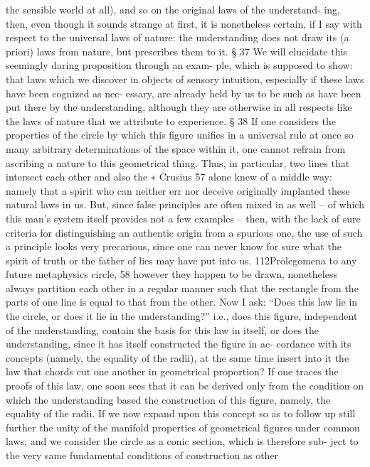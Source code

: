 the sensible world at all), and so on the original laws of the understand-
ing, then, even though it sounds strange at ﬁrst, it is nonetheless certain,
if I say with respect to the universal laws of nature: the understanding does
not draw its (a priori) laws from nature, but prescribes them to it.
§ 37
We will elucidate this seemingly daring proposition through an exam-
ple, which is supposed to show: that laws which we discover in objects
of sensory intuition, especially if these laws have been cognized as nec-
essary, are already held by us to be such as have been put there by the
understanding, although they are otherwise in all respects like the laws
of nature that we attribute to experience.
§ 38
If one considers the properties of the circle by which this ﬁgure uniﬁes
in a universal rule at once so many arbitrary determinations of the space
within it, one cannot refrain from ascribing a nature to this geometrical
thing. Thus, in particular, two lines that intersect each other and also the
∗
Crusius 57 alone knew of a middle way: namely that a spirit who can neither
err nor deceive originally implanted these natural laws in us. But, since false
principles are often mixed in as well – of which this man’s system itself provides
not a few examples – then, with the lack of sure criteria for distinguishing an
authentic origin from a spurious one, the use of such a principle looks very
precarious, since one can never know for sure what the spirit of truth or the
father of lies may have put into us.
112Prolegomena to any future metaphysics
circle, 58 however they happen to be drawn, nonetheless always partition
each other in a regular manner such that the rectangle from the parts of
one line is equal to that from the other. Now I ask: “Does this law lie
in the circle, or does it lie in the understanding?” i.e., does this ﬁgure,
independent of the understanding, contain the basis for this law in itself,
or does the understanding, since it has itself constructed the ﬁgure in ac-
cordance with its concepts (namely, the equality of the radii), at the same
time insert into it the law that chords cut one another in geometrical
proportion? If one traces the proofs of this law, one soon sees that it can
be derived only from the condition on which the understanding based
the construction of this ﬁgure, namely, the equality of the radii. If we
now expand upon this concept so as to follow up still further the unity
of the manifold properties of geometrical ﬁgures under common laws,
and we consider the circle as a conic section, which is therefore sub-
ject to the very same fundamental conditions of construction as other
